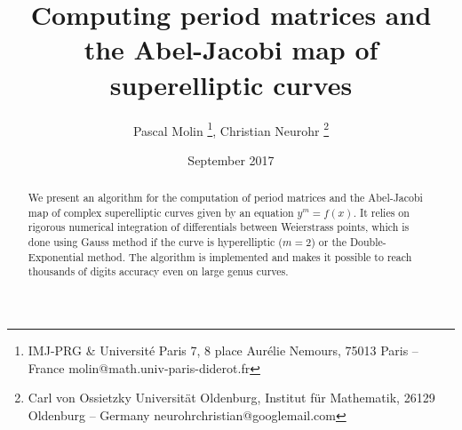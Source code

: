 \documentclass[10pt,a4paper]{article}
\title{Computing period matrices and the Abel-Jacobi map of superelliptic curves}
\author{%
    Pascal Molin
        \thanks{IMJ-PRG \& Université Paris 7,
        8 place Aurélie Nemours,
        75013 Paris -- France\newline
        molin@math.univ-paris-diderot.fr},
    Christian Neurohr
        \thanks{Carl von Ossietzky Universität Oldenburg,
        Institut für Mathematik,
        26129 Oldenburg -- Germany\newline
        neurohrchristian@googlemail.com}}
\date{September 2017}
\def\biblio{}
\begin{document}
\def\biblio{}

\maketitle


\begin{abstract}
    We present an algorithm for the computation of period matrices and the
    Abel-Jacobi map of complex superelliptic curves given by an equation
    $y^m=f(x)$. It relies on rigorous numerical integration of differentials
    between Weierstrass points, which is done using Gauss method if the curve is
    hyperelliptic ($m=2$) or the Double-Exponential method.
    The algorithm is implemented and makes it possible to reach
    thousands of digits accuracy even on large genus curves.
\end{abstract}
























\end{document}
